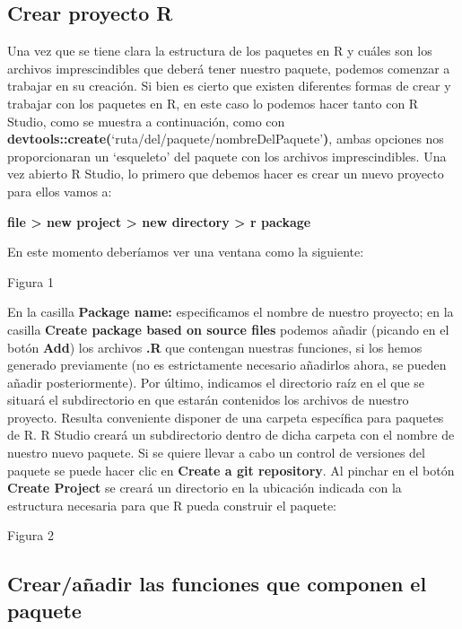 \subsection{Crear proyecto R}

Una vez que se tiene clara la estructura de los paquetes en R y cu\'ales son los archivos
imprescindibles que deber\'a tener nuestro paquete, podemos comenzar a trabajar en su
creaci\'on. Si bien es cierto que existen diferentes formas de crear y trabajar con los paquetes
en R, en este caso lo podemos hacer tanto con R Studio, como se muestra a continuaci\'on,
como con \textbf{devtools::create(}\enquote*{ruta/del/paquete/nombreDelPaquete}\textbf{)}, ambas opciones nos
proporcionaran un \enquote*{esqueleto} del paquete con los archivos imprescindibles.
Una vez abierto R Studio, lo primero que debemos hacer es crear un nuevo proyecto para
ellos vamos a: 
\begin{center}
    \textbf{file > new project > new directory > r package} 
\end{center}

En este momento deber\'iamos ver una ventana como la siguiente:

Figura 1

En la casilla \textbf{Package name:} especificamos el nombre de nuestro proyecto; en la casilla
\textbf{Create package based on source files} podemos a\~nadir (picando en el bot\'on \textbf{Add}) los
archivos \textbf{.R} que contengan nuestras funciones, si los hemos generado previamente (no es
estrictamente necesario a\~nadirlos ahora, se pueden a\~nadir posteriormente).
Por \'ultimo, indicamos el directorio ra\'iz en el que se situar\'a el subdirectorio en que estar\'an
contenidos los archivos de nuestro proyecto. Resulta conveniente disponer de una carpeta
espec\'ifica para paquetes de R. R Studio crear\'a un subdirectorio dentro de dicha carpeta con
el nombre de nuestro nuevo paquete.
Si se quiere llevar a cabo un control de versiones del paquete se puede hacer clic en \textbf{Create
a git repository}.
Al pinchar en el bot\'on \textbf{Create Project} se crear\'a un directorio en la ubicaci\'on indicada con la
estructura necesaria para que R pueda construir el paquete:

Figura 2



\subsection{Crear/a\~nadir las funciones que componen el paquete}

